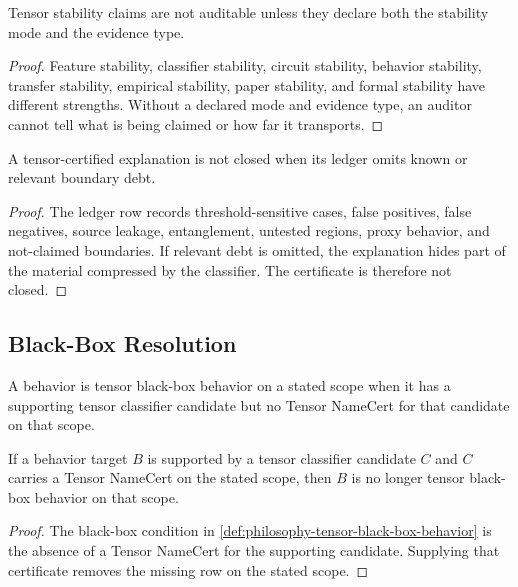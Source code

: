 \begin{theorem}
\label{thm:philosophy-stability-claims-require-mode}
Tensor stability claims are not auditable unless they declare both the
stability mode and the evidence type.
\end{theorem}
\begin{proof}
Feature stability, classifier stability, circuit stability, behavior
stability, transfer stability, empirical stability, paper stability, and
formal stability have different strengths. Without a declared mode and
evidence type, an auditor cannot tell what is being claimed or how far it
transports.
\end{proof}

\begin{theorem}
\label{thm:philosophy-tensor-ledger-gaps-prevent-closed-explanation}
A tensor-certified explanation is not closed when its ledger omits known
or relevant boundary debt.
\end{theorem}
\begin{proof}
The ledger row records threshold-sensitive cases, false positives, false
negatives, source leakage, entanglement, untested regions, proxy
behavior, and not-claimed boundaries. If relevant debt is omitted, the
explanation hides part of the material compressed by the classifier. The
certificate is therefore not closed.
\end{proof}

\subsection{Black-Box Resolution}
\label{subsec:philosophy-tensor-black-box-resolution}

\begin{definition}
\label{def:philosophy-tensor-black-box-behavior}
A behavior is tensor black-box behavior on a stated scope when it has a
supporting tensor classifier candidate but no Tensor NameCert for that
candidate on that scope.
\end{definition}

\begin{theorem}
\label{thm:philosophy-tensor-namecert-resolves-black-box}
If a behavior target $B$ is supported by a tensor classifier candidate
$C$ and $C$ carries a Tensor NameCert on the stated scope, then $B$ is no
longer tensor black-box behavior on that scope.
\end{theorem}
\begin{proof}
The black-box condition in
\autoref{def:philosophy-tensor-black-box-behavior} is the absence of a
Tensor NameCert for the supporting candidate. Supplying that certificate
removes the missing row on the stated scope.
\end{proof}

